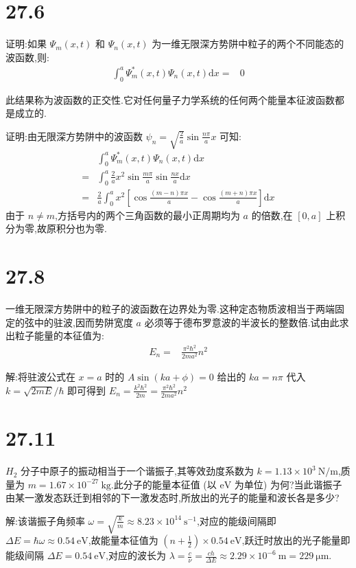     \section{27.6} 证明:如果 $\Psi_{m}\left( x,t \right) $ 和 $\Psi_{n}\left( x,t \right) $ 为一维无限深方势阱中粒子的两个不同能态的波函数,则:
    \begin{align}
        \int_{0}^{a}\Psi_{m}^{*}\left( x,t \right) \Psi_{n}\left( x,t \right) \mathrm{d}x=&0\nonumber
    \end{align}

    此结果称为波函数的正交性.它对任何量子力学系统的任何两个能量本征波函数都是成立的.

    证明:由无限深方势阱中的波函数 $\psi_{n}=\sqrt{\frac{2}{a}}\sin \frac{n\pi}{a}x$ 可知:
    \begin{align}
        &\int_{0}^{a}\Psi_{m}^{*}\left( x,t \right) \Psi_{n}\left( x,t \right) \mathrm{d}x\nonumber\\
        =&\int_{0}^{a}\frac{2}{a}x^2\sin \frac{m\pi}{a}\sin \frac{nx}{a}\mathrm{d}x\nonumber\\
        =&\frac{2}{a}\int_{0}^{a}x^2\left[\cos \frac{\left( m-n \right) \pi x}{a}-\cos \frac{\left( m+n \right) \pi x}{a} \right]\mathrm{d}x\nonumber
    \end{align}
    由于 $n\ne m$,方括号内的两个三角函数的最小正周期均为 $a$ 的倍数,在 $[0,a]$ 上积分为零,故原积分也为零.
    \section{27.8} 一维无限深方势阱中的粒子的波函数在边界处为零.这种定态物质波相当于两端固定的弦中的驻波,因而势阱宽度 $a$ 必须等于德布罗意波的半波长的整数倍.试由此求出粒子能量的本征值为:
    \begin{align}
        E_{n}=&\frac{\pi^2 \hbar^2}{2ma^2}n^2\nonumber
    \end{align}
    
    解:将驻波公式在 $x=a$ 时的 $A\sin\left( ka+\phi \right) =0$ 给出的 $ka=n\pi$ 代入 $k=\sqrt{2mE} / \hbar$ 即可得到 $E_{n}=\frac{k^2\hbar^2}{2m}=\frac{\pi^2\hbar^2}{2ma^2}n^2$
    \section{27.11} $H_{2}$ 分子中原子的振动相当于一个谐振子,其等效劲度系数为 $k=1.13\times 10^{3} \ \mathrm{N / m}$,质量为 $m=1.67\times 10^{-27} \ \mathrm{kg}$.此分子的能量本征值 (以 $\mathrm{eV}$ 为单位) 为何?当此谐振子由某一激发态跃迁到相邻的下一激发态时,所放出的光子的能量和波长各是多少?

    解:该谐振子角频率 $\omega=\sqrt{\frac{k}{m}}\approx 8.23\times 10^{14} \ \mathrm{s^{-1}}$,对应的能级间隔即 $\Delta E=\hbar \omega\approx 0.54 \ \mathrm{eV}$,故能量本征值为 $\left( n+\frac{1}{2} \right) \times 0.54 \ \mathrm{eV}$,跃迁时放出的光子能量即能级间隔 $\Delta E=0.54 \ \mathrm{eV}$,对应的波长为 $\lambda=\frac{c}{\nu}=\frac{ch}{\Delta E}\approx 2.29\times 10^{-6} \ \mathrm{m}=229 \ \mathrm{\mu m}$.

